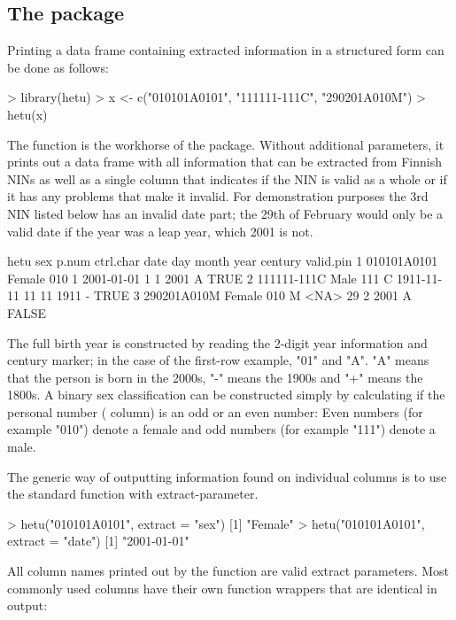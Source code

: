 \subsection{The  package}

Printing a data frame containing extracted information in a structured form can be done as follows:

\begin{example}
 > library(hetu)
 > x <- c("010101A0101", "111111-111C", "290201A010M")
 > hetu(x)
\end{example}

The  function is the workhorse of the  package. Without additional parameters, it prints out a data frame with all information that can be extracted from Finnish NINs as well as a single column that indicates if the NIN is valid as a whole or if it has any problems that make it invalid. For demonstration purposes the 3rd NIN listed below has an invalid date part; the 29th of February would only be a valid date if the year was a leap year, which 2001 is not.

\begin{example}
         hetu    sex p.num ctrl.char       date day month year century valid.pin
1 010101A0101 Female   010         1 2001-01-01   1     1 2001       A      TRUE
2 111111-111C   Male   111         C 1911-11-11  11    11 1911       -      TRUE
3 290201A010M Female   010         M       <NA>  29     2 2001       A     FALSE
\end{example}

The full birth year is constructed by reading the 2-digit year information and century marker; in the case of the first-row example, "01" and "A". "A" means that the person is born in the 2000s, "-" means the 1900s and "+" means the 1800s. A binary sex classification can be constructed simply by calculating if the personal number ( column) is an odd or an even number: Even numbers (for example "010") denote a female and odd numbers (for example "111") denote a male.

The generic way of outputting information found on individual columns is to use the standard  function with extract-parameter.

\begin{example}
  > hetu("010101A0101", extract = "sex")
  [1] "Female"
  > hetu("010101A0101", extract = "date")
  [1] "2001-01-01"
\end{example}

All column names printed out by the  function are valid extract parameters. Most commonly used columns have their own function wrappers that are identical in output:

